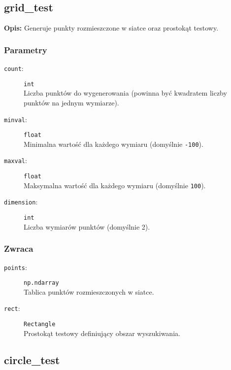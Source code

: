\documentclass[12pt]{article}
\begin{document}
\subsection{grid\_test}

\textbf{Opis:} Generuje punkty rozmieszczone w siatce oraz prostokąt testowy.

\subsubsection{Parametry}

\begin{description}
    \item[\texttt{count}:] \texttt{int} \\
    Liczba punktów do wygenerowania (powinna być kwadratem liczby punktów na jednym wymiarze).
    
    \item[\texttt{minval}:] \texttt{float} \\
    Minimalna wartość dla każdego wymiaru (domyślnie \texttt{-100}).
    
    \item[\texttt{maxval}:] \texttt{float} \\
    Maksymalna wartość dla każdego wymiaru (domyślnie \texttt{100}).
    
    \item[\texttt{dimension}:] \texttt{int} \\
    Liczba wymiarów punktów (domyślnie 2).
\end{description}

\subsubsection{Zwraca}

\begin{description}
    \item[\texttt{points}:] \texttt{np.ndarray} \\
    Tablica punktów rozmieszczonych w siatce.
    
    \item[\texttt{rect}:] \texttt{Rectangle} \\
    Prostokąt testowy definiujący obszar wyszukiwania.
\end{description}

\subsection{circle\_test}
\end{document}
